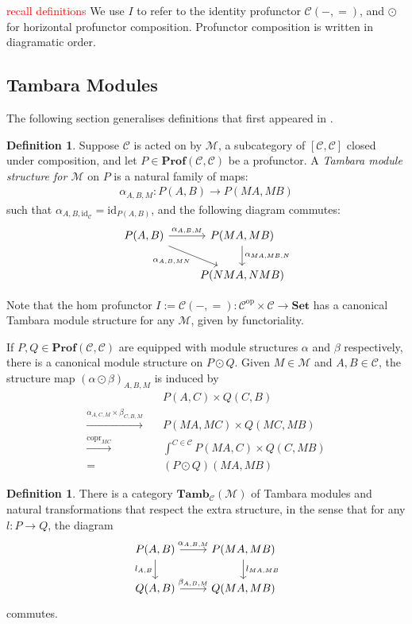 \documentclass[11pt,a4paper]{article}
\theoremstyle{plain}
\theoremstyle{definition}
\newtheorem{definition}[theorem]{Definition}
\newcommand{\C}{\mathscr{C}}
\newcommand{\M}{\mathscr{M}}
\newcommand{\Set}{\mathbf{Set}}
\newcommand{\Prof}{\mathbf{Prof}}
\newcommand{\Tamb}{\mathbf{Tamb}}
\newcommand{\id}{\mathrm{id}}
\newcommand{\op}{\mathrm{op}}
\DeclareMathOperator{\copr}{copr}
\newcommand{\todo}[1]{\textcolor{red}{\small #1}}
\begin{document}
\todo{recall definitions} We use $I$ to refer to the identity profunctor $\C(-,{=})$, and $\odot$ for horizontal profunctor composition. Profunctor composition is written in diagramatic order.

\subsection{Tambara Modules}
The following section generalises definitions that first appeared in \cite{Doubles}.
\begin{definition}
Suppose $\C$ is acted on by $\M$, a subcategory of $[\C, \C]$ closed under composition, and let $P \in \Prof(\C, \C)$ be a profunctor. A \emph{Tambara module structure for $\M$} on $P$ is a natural family of maps:
\begin{align*}
\alpha_{A,B,M} : P(A,B) \to P(MA, MB)
\end{align*}
such that $\alpha_{A,B,\id_\C} = \id_{P(A,B)}$, and the following diagram commutes:
\[
\begin{tikzcd}
P(A,B) \ar[r, "\alpha_{A,B,M}"] \ar[dr, "\alpha_{A, B, MN}" below left] & P(MA, MB) \ar[d, "\alpha_{MA, MB, N}" right] \\
& P(NMA, NMB)
\end{tikzcd}
\]
\end{definition}

Note that the hom profunctor $I := \C(-, =) : \C^\op \times \C \to \Set$ has a canonical Tambara module structure for any $\M$, given by functoriality.

If $P, Q \in \Prof(\C, \C)$ are equipped with module structures $\alpha$ and $\beta$ respectively, there is a canonical module structure on $P \odot Q$. Given $M \in \M$ and $A,B \in \C$, the structure map $(\alpha \odot \beta)_{A,B,M}$ is induced by
\begin{align*}
&P(A,C) \times Q(C,B)  \\
\xrightarrow{\alpha_{A,C,M} \times \beta_{C,B,M}} \quad& P(MA, MC) \times Q(MC, MB) \\
\xrightarrow{\copr_{MC}} \quad&\int^{C \in \C} P(MA, C) \times Q(C, MB) \\
= \quad&(P \odot Q)(MA, MB)
\end{align*}

\begin{definition}
There is a category $\Tamb_\C(\M)$ of Tambara modules and natural transformations that respect the extra structure, in the sense that for any $l : P \to Q$, the diagram
\[
\begin{tikzcd}
P(A,B) \ar[r, "\alpha_{A,B,M}"] \ar[d, "l_{A,B}" left] & P(MA, MB) \ar[d, "l_{MA, MB}" right] \\
Q(A,B) \ar[r, "\beta_{A,B,M}"] & Q(MA, MB)
\end{tikzcd}
\]
commutes.
\end{definition}
\end{document}
